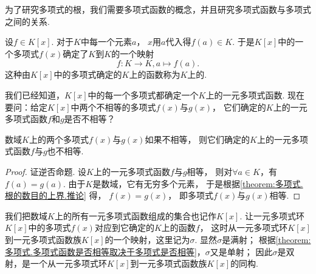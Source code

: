 为了研究多项式的根，我们需要多项式函数的概念，并且研究多项式函数与多项式之间的关系.

设\(f \in K[x]\).
对于\(K\)中每一个元素\(a\)，
\(x\)用\(a\)代入得\(f(a) \in K\).
于是\(K[x]\)中的一个多项式\(f(x)\)确定了\(K\)到\(K\)的一个映射\[
    f\colon K \to K, a \mapsto f(a).
\]
这种由\(K[x]\)中的多项式确定的\(K\)上的函数称为\(K\)上的.

我们已经知道，\(K[x]\)中的每一个多项式都确定一个\(K\)上的一元多项式函数.
现在要问：给定\(K[x]\)中两个不相等的多项式\(f(x)\)与\(g(x)\)，
它们确定的\(K\)上的一元多项式函数\(f\)和\(g\)是否不相等？
\begin{theorem}\label{theorem:多项式.多项式函数是否相等取决于多项式是否相等}
数域\(K\)上的两个多项式\(f(x)\)与\(g(x)\)如果不相等，
则它们确定的\(K\)上的一元多项式函数\(f\)与\(g\)也不相等.
\begin{proof}
证逆否命题.
设\(K\)上的一元多项式函数\(f\)与\(g\)相等，
则对\(\forall a \in K\)，有\(f(a)=g(a)\).
由于\(K\)是数域，它有无穷多个元素，
于是根据\cref{theorem:多项式.根的数目的上界.推论} 得，
\(f(x)=g(x)\)，
即多项式\(f(x)\)与\(g(x)\)相等.
\end{proof}
\end{theorem}

我们把数域\(K\)上的所有一元多项式函数组成的集合也记作\(K[x]\).
让一元多项式环\(K[x]\)中的多项式\(f(x)\)对应到它确定的\(K\)上的函数\(f\)，
这时从一元多项式环\(K[x]\)到一元多项式函数族\(K[x]\)的一个映射，这里记为\(\sigma\).
显然\(\sigma\)是满射；
根据\cref{theorem:多项式.多项式函数是否相等取决于多项式是否相等}，\(\sigma\)又是单射；
因此\(\sigma\)是双射，是一个从一元多项式环\(K[x]\)到一元多项式函数族\(K[x]\)的同构.
